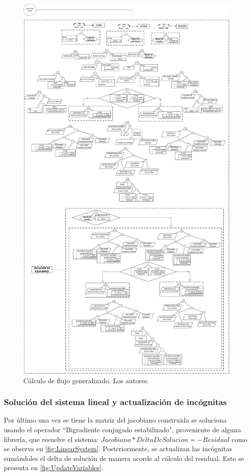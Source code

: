 \begin{figure}[h]
	\centering%
	\includegraphics[height=0.9\textheight]{Fig/CalcularFlujo.pdf}%
	\caption[Cálculo de flujo generalizado.]{Cálculo de flujo generalizado. Los autores.} \label{fig:Flow}
\end{figure}

\subsubsection{Solución del sistema lineal y actualización de incógnitas}
Por último una vez se tiene la matriz del jacobiano construida se soluciona usando el operador ``Bigradiente conjugado estabilizado", proveniente de alguna librería, que resuelve el sistema: $Jacobiano*DeltaDeSolucion = -Residual$ como se observa en \ref{fig:LinearSystem}. Posteriormente, se actualizan las incógnitas sumándoles el delta de solución de manera acorde al cálculo del residual. Esto se presenta en \ref{fig:UpdateVariables}. \\

